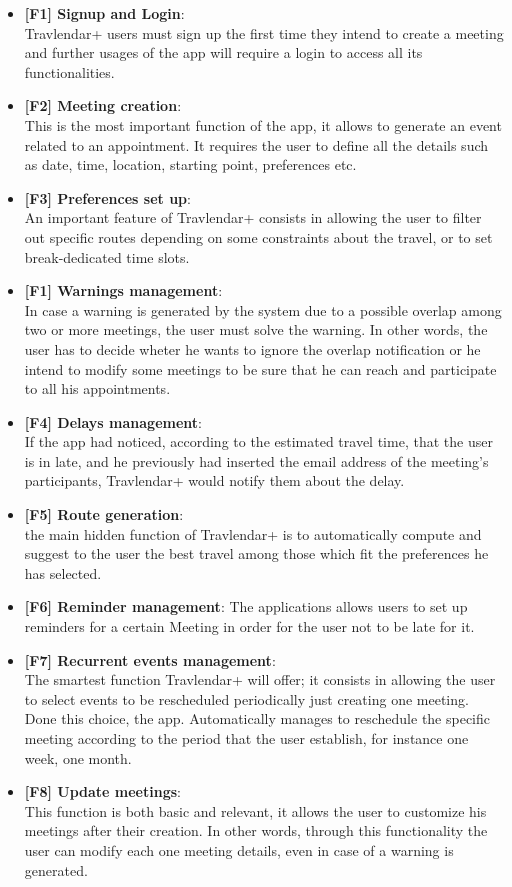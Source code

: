 
\begin{itemize}

\item \textbf{[\hypertarget{F1}{F1}] Signup and Login}: \\Travlendar+ users must sign up the first time they intend to create a meeting and further usages of the app will require a login to access all its functionalities.
\item \textbf{[\hypertarget{F2}{F2}] Meeting creation}: \\This is the most important function of the app, it allows to generate an event related to an appointment. It requires the user to define all the details such as date, time, location, starting point, preferences etc. 
\item \textbf{[\hypertarget{F3}{F3}] Preferences set up}: \\An important feature of Travlendar+ consists in allowing the user to filter out specific routes depending on some constraints about the travel, or to set break-dedicated time slots.
\item \textbf{[\hypertarget{F1}{F1}] Warnings management}: \\ In case a warning is generated by the system due to a possible overlap among two or more meetings, the user must solve the warning. In other words, the user has to decide wheter he wants to ignore the overlap notification or he intend to modify some meetings to be sure that he can reach and participate to all his appointments.
\item \textbf{[\hypertarget{F4}{F4}] Delays management}:  \\If the app had noticed, according to the estimated travel time, that the user is in late, and he previously had inserted the email address of the meeting’s participants, Travlendar+ would notify them about the delay. 
\item \textbf{[\hypertarget{F5}{F5}] Route generation}:\\ the main hidden function of Travlendar+ is to automatically compute and suggest to the user the best travel among those which fit the preferences he has selected.
\item \textbf{[\hypertarget{F6}{F6}] Reminder management}: The applications allows users to set up reminders for a certain Meeting in order for the user not to be late for it.
\item \textbf{[\hypertarget{F7}{F7}] Recurrent events management}:\\ The smartest function Travlendar+ will offer; it consists in allowing the user to select events to be rescheduled periodically just creating one meeting. Done this choice, the app. Automatically manages to  reschedule the specific meeting according to the period that the user establish, for instance one week, one month.
\item \textbf{[\hypertarget{F8}{F8}] Update meetings}: \\This function is both basic and relevant, it allows the user to customize his meetings after their creation. In other words, through this functionality the user can modify each one meeting details, even in case of a warning is generated.


\end{itemize}

 
